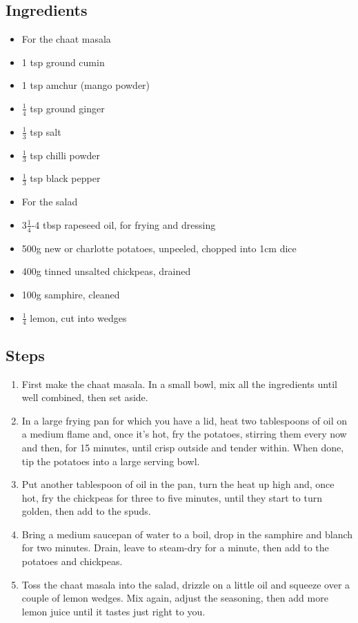 \documentclass{book}
\begin{document}
\subsection*{Ingredients}
\begin{itemize}
\item For the chaat masala
\item 1 tsp ground cumin 
\item 1 tsp amchur (mango powder) 
\item $\frac{1}{4}$ tsp ground ginger 
\item $\frac{1}{3}$ tsp salt
\item $\frac{1}{3}$ tsp chilli powder
\item $\frac{1}{3}$ tsp black pepper
\end{itemize}

\begin{itemize}
\item For the salad
\item 3$\frac{1}{4}$-4 tbsp rapeseed oil, for frying and dressing 
\item 500g new or charlotte potatoes, unpeeled, chopped into 1cm dice
\item 400g tinned unsalted chickpeas, drained 
\item 100g samphire, cleaned
\item $\frac{1}{4}$ lemon, cut into wedges
\end{itemize}

\subsection*{Steps}
\begin{enumerate}
\item First make the chaat masala. In a small bowl, mix all the ingredients until well combined, then set aside.
\item In a large frying pan for which you have a lid, heat two tablespoons of oil on a medium flame and, once it’s hot, fry the potatoes, stirring them every now and then, for 15 minutes, until crisp outside and tender within. When done, tip the potatoes into a large serving bowl.
\item Put another tablespoon of oil in the pan, turn the heat up high and, once hot, fry the chickpeas for three to five minutes, until they start to turn golden, then add to the spuds.
\item Bring a medium saucepan of water to a boil, drop in the samphire and blanch for two minutes. Drain, leave to steam-dry for a minute, then add to the potatoes and chickpeas.
\item Toss the chaat masala into the salad, drizzle on a little oil and squeeze over a couple of lemon wedges. Mix again, adjust the seasoning, then add more lemon juice until it tastes just right to you.
\end{enumerate}
\newpage
\end{document}
